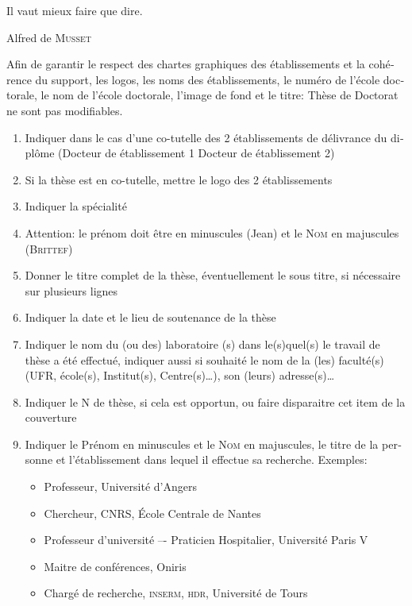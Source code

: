 \begin{otherlanguage}{french}
	\epigraph{Il vaut mieux faire que dire.}{Alfred de \textsc{Musset}}
	\minitoc%
	Afin de garantir le respect des chartes graphiques des établissements et la cohérence du support, les  logos, les noms des établissements, le numéro de l’école doctorale, le nom de l’école doctorale, l’image de fond et le titre: Thèse de Doctorat ne sont pas modifiables.
	
	\begin{enumerate}[label= (\arabic*)]
		\item Indiquer dans le cas d’une co-tutelle des 2 établissements de délivrance du diplôme (Docteur de établissement 1 Docteur de établissement 2)
		\item Si la thèse est en co-tutelle, mettre le logo des 2 établissements
		\item Indiquer la spécialité
		\item Attention: le prénom doit être en minuscules (Jean) et le \textsc{Nom} en majuscules (\textsc{Brittef})
		\item Donner le titre complet de la thèse, éventuellement le sous titre, si nécessaire sur plusieurs lignes
		\item Indiquer la date et le lieu de soutenance de la thèse
		\item Indiquer le nom du (ou des) laboratoire (s) dans le(s)quel(s) le travail de thèse a été effectué, indiquer aussi si souhaité le nom de la (les) faculté(s) (UFR, école(s), Institut(s), Centre(s)\ldots), son 	(leurs) adresse(s)\ldots
		\item Indiquer le N\textordmasculine{} de thèse, si cela est opportun, ou faire disparaitre cet item de la couverture
		\item Indiquer le Prénom en minuscules et le \textsc{Nom} en majuscules, le titre de la personne et
		l’établissement dans lequel il effectue sa recherche. Exemples:
		\begin{itemize}
			\item Professeur, Université d’Angers
			\item Chercheur, CNRS, École Centrale de Nantes
			\item Professeur d’université –- Praticien Hospitalier, Université Paris V
			\item Maitre de conférences, Oniris
			\item Chargé de recherche, \textsc{inserm}, \textsc{hdr}, Université de Tours
		\end{itemize}
	\end{enumerate}
	

\end{otherlanguage}
